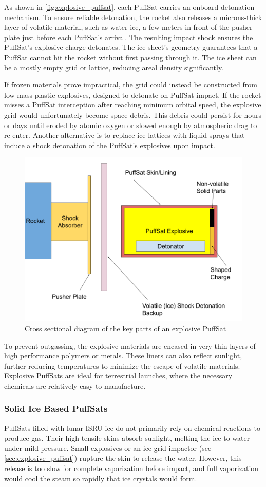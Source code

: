\documentclass{article}
\begin{document}
As shown in \autoref{fig:explosive_puffsat}, each PuffSat carries an onboard detonation mechanism. To ensure reliable detonation, the rocket also releases a microns-thick layer of volatile material, such as water ice, a few meters in front of the pusher plate just before each PuffSat's arrival. The resulting impact shock ensures the PuffSat’s explosive charge detonates. The ice sheet’s geometry guarantees that a PuffSat cannot hit the rocket without first passing through it.  The ice sheet can be a mostly empty grid or lattice, reducing areal density significantly.

If frozen materials prove impractical, the grid could instead be constructed from low-mass plastic explosives, designed to detonate on PuffSat impact.  If the rocket misses a PuffSat interception after reaching  minimum orbital speed, the explosive grid would unfortunately become space debris. This debris could  persist for hours or days until eroded by atomic oxygen or slowed enough by atmospheric drag to re-enter. Another alternative is to replace ice lattices with liquid sprays that induce a shock detonation of the PuffSat’s explosives upon impact.

\begin{figure}
    \centering
    \includegraphics[width=0.5\linewidth]{images/Explosive PuffSat.png}
    \caption{Cross sectional diagram of the key parts of an explosive PuffSat}
    \label{fig:explosive_puffsat}
\end{figure}

To prevent outgassing, the explosive materials are encased in very thin layers of high performance polymers or metals. These liners can also reflect sunlight, further reducing temperatures to minimize the escape of volatile materials. Explosive PuffSats are ideal for terrestrial launches, where the necessary chemicals are relatively easy to manufacture.

\subsubsection{Solid Ice Based PuffSats} \label{sec:icy_puffsat}
PuffSats filled with lunar ISRU ice do not primarily rely on chemical reactions to produce gas. Their high tensile skins absorb sunlight, melting the ice to water under mild pressure. Small explosives or an ice grid impactor (see \autoref{sec:explosive_puffsat}) rupture the skin to release the water. However, this release is too slow for complete vaporization before impact, and full vaporization would cool the steam so rapidly that ice crystals would form.
\end{document}
